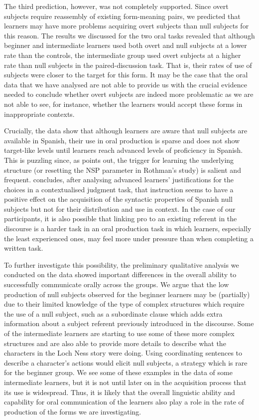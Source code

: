 \documentclass[output=paper]{langscibook}
\begin{document}
The third prediction, however, was not completely supported. Since overt subjects require reassembly of existing form-meaning pairs, we predicted that learners may have more problems acquiring overt subjects than null subjects for this reason. The results we discussed for the two oral tasks revealed that although beginner and intermediate learners used both overt and null subjects at a lower rate than the controls, the intermediate group used overt subjects at a higher rate than null subjects in the paired-discussion task. That is, their rates of use of subjects were closer to the target for this form. It may be the case that the oral data that we have analysed are not able to provide us with the crucial evidence needed to conclude whether overt subjects are indeed more problematic as we are not able to see, for instance, whether the learners would accept these forms in inappropriate contexts.

Crucially, the data show that although learners are aware that null subjects are available in Spanish, their use in oral production is sparse and does not show target-like levels until learners reach advanced levels of proficiency in Spanish. This is puzzling since, as \citet{RothmanIverson2007} points out, the trigger for learning the underlying structure (or resetting the NSP parameter in Rothman’s study) is salient and frequent. \citet{Pladevall2013} concludes, after analysing advanced learners’ justifications for the choices in a contextualised judgment task, that instruction seems to have a positive effect on the acquisition of the syntactic properties of Spanish null subjects but not for their distribution and use in context. In the case of our participants, it is also possible that linking pro to an existing referent in the discourse is a harder task in an oral production task in which learners, especially the least experienced ones, may feel more under pressure than when completing a written task.

To further investigate this possibility, the preliminary qualitative analysis we conducted on the data showed important differences in the overall ability to successfully communicate orally across the groups. We argue that the low production of null subjects observed for the beginner learners may be (partially) due to their limited knowledge of the type of complex structures which require the use of a null subject, such as a subordinate clause which adds extra information about a subject referent previously introduced in the discourse. Some of the intermediate learners are starting to use some of these more complex structures and are also able to provide more details to describe what the characters in the Loch Ness story were doing. Using coordinating sentences to describe a character's actions would elicit null subjects, a strategy which is rare for the beginner group. We see some of these examples in the data of some intermediate learners, but it is not until later on in the acquisition process that its use is widespread. Thus, it is likely that the overall linguistic ability and capability for oral communication of the learners also play a role in the rate of production of the forms we are investigating.
\end{document}
